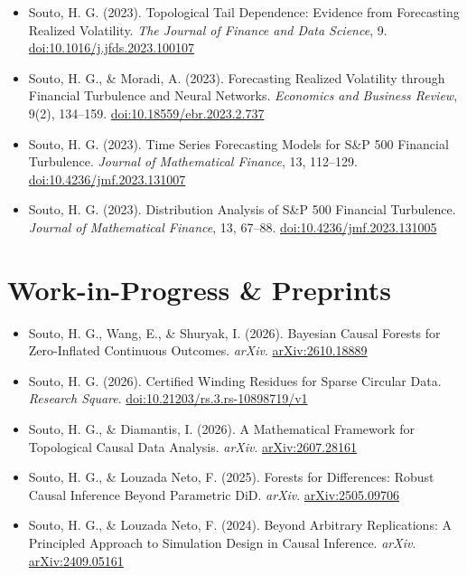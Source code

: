 \documentclass[10pt,a4paper]{article}
\begin{document}
\begin{itemize}
    \item Souto, H. G. (2023). Topological Tail Dependence: Evidence from Forecasting Realized Volatility. \textit{The Journal of Finance and Data Science}, 9. \href{https://doi.org/10.1016/j.jfds.2023.100107}{doi:10.1016/j.jfds.2023.100107}
    \item Souto, H. G., \& Moradi, A. (2023). Forecasting Realized Volatility through Financial Turbulence and Neural Networks. \textit{Economics and Business Review}, 9(2), 134--159. \href{https://doi.org/10.18559/ebr.2023.2.737}{doi:10.18559/ebr.2023.2.737}
    \item Souto, H. G. (2023). Time Series Forecasting Models for S\&P 500 Financial Turbulence. \textit{Journal of Mathematical Finance}, 13, 112--129. \href{https://doi.org/10.4236/jmf.2023.131007}{doi:10.4236/jmf.2023.131007}
    \item Souto, H. G. (2023). Distribution Analysis of S\&P 500 Financial Turbulence. \textit{Journal of Mathematical Finance}, 13, 67--88. \href{https://doi.org/10.4236/jmf.2023.131005}{doi:10.4236/jmf.2023.131005}
    \fi
\end{itemize}

\section{Work-in-Progress \& Preprints}
\begin{itemize}
    \item Souto, H. G., Wang, E., \& Shuryak, I. (2026). Bayesian Causal Forests for Zero-Inflated Continuous Outcomes. \textit{arXiv}. \href{https://arxiv.org/abs/2610.18889}{arXiv:2610.18889}
    \item Souto, H. G. (2026). Certified Winding Residues for Sparse Circular Data. \textit{Research Square}. \href{https://doi.org/10.21203/rs.3.rs-10898719/v1}{doi:10.21203/rs.3.rs-10898719/v1}
    \item Souto, H. G., \& Diamantis, I. (2026). A Mathematical Framework for Topological Causal Data Analysis. \textit{arXiv}. \href{https://doi.org/10.48550/arXiv.2607.28161}{arXiv:2607.28161}
    \ifshortcv\else
    \item Souto, H. G., \& Louzada Neto, F. (2025). Forests for Differences: Robust Causal Inference Beyond Parametric DiD. \textit{arXiv}. \href{https://doi.org/10.48550/arXiv.2505.09706}{arXiv:2505.09706}
    \item Souto, H. G., \& Louzada Neto, F. (2024). Beyond Arbitrary Replications: A Principled Approach to Simulation Design in Causal Inference. \textit{arXiv}. \href{https://doi.org/10.48550/arXiv.2409.05161}{arXiv:2409.05161}
    \fi
\end{itemize}
\end{document}

